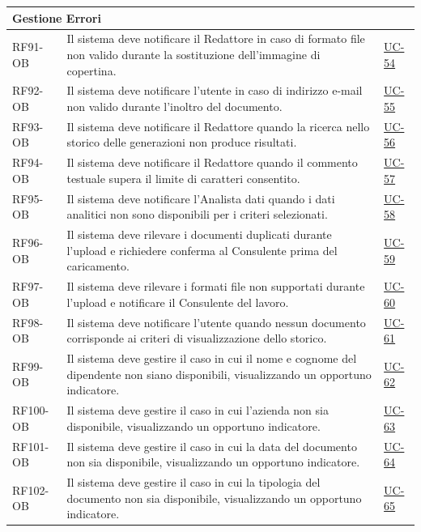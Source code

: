 ﻿\documentclass[a4paper,12pt]{article}
\begin{document}
\begin{description}[style=multiline, leftmargin=4cm, font=\bfseries]
\begin{enumerate}[leftmargin=*, nosep]
{\begin{longtable}{|p{2.5cm}|p{9.5cm}|p{3.5cm}|}
    \multicolumn{3}{|l|}{\cellcolor{gray!12}\textbf{Gestione Errori}} \\
    \hline
    RF91-OB & Il sistema deve notificare il Redattore in caso di formato file non valido durante la sostituzione dell'immagine di copertina. & \hyperref[errore-uc-54]{UC-54} \\
    \hline
    RF92-OB & Il sistema deve notificare l'utente in caso di indirizzo e-mail non valido durante l'inoltro del documento. & \hyperref[errore-uc-55]{UC-55} \\
    \hline
    RF93-OB & Il sistema deve notificare il Redattore quando la ricerca nello storico delle generazioni non produce risultati. & \hyperref[errore-uc-56]{UC-56} \\
    \hline
    RF94-OB & Il sistema deve notificare il Redattore quando il commento testuale supera il limite di caratteri consentito. & \hyperref[errore-uc-57]{UC-57} \\
    \hline
    RF95-OB & Il sistema deve notificare l'Analista dati quando i dati analitici non sono disponibili per i criteri selezionati. & \hyperref[errore-uc-58]{UC-58} \\
    \hline
    RF96-OB & Il sistema deve rilevare i documenti duplicati durante l'upload e richiedere conferma al Consulente prima del caricamento. & \hyperref[errore-uc-59]{UC-59} \\
    \hline
    RF97-OB & Il sistema deve rilevare i formati file non supportati durante l'upload e notificare il Consulente del lavoro. & \hyperref[errore-uc-60]{UC-60} \\
    \hline
    RF98-OB & Il sistema deve notificare l'utente quando nessun documento corrisponde ai criteri di visualizzazione dello storico. & \hyperref[errore-uc-61]{UC-61} \\
    \hline
    RF99-OB & Il sistema deve gestire il caso in cui il nome e cognome del dipendente non siano disponibili, visualizzando un opportuno indicatore. & \hyperref[errore-uc-62]{UC-62} \\
    \hline
    RF100-OB & Il sistema deve gestire il caso in cui l'azienda non sia disponibile, visualizzando un opportuno indicatore. & \hyperref[errore-uc-63]{UC-63} \\
    \hline
    RF101-OB & Il sistema deve gestire il caso in cui la data del documento non sia disponibile, visualizzando un opportuno indicatore. & \hyperref[errore-uc-64]{UC-64} \\
    \hline
    RF102-OB & Il sistema deve gestire il caso in cui la tipologia del documento non sia disponibile, visualizzando un opportuno indicatore. & \hyperref[errore-uc-65]{UC-65} \\

\end{longtable}}
\end{enumerate}
\end{description}
\end{document}
